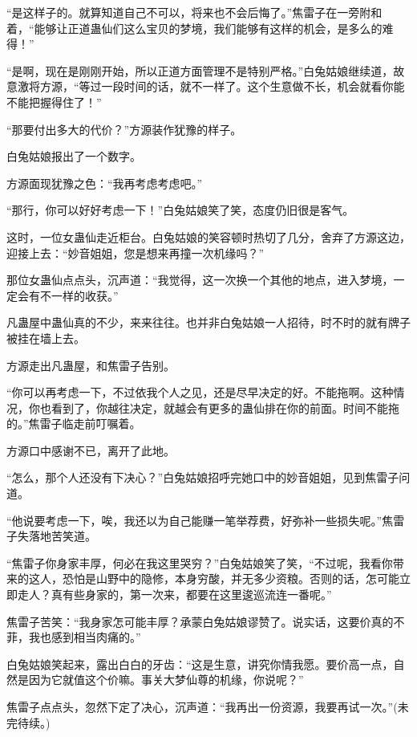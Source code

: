 \begin{this_body}
“是这样子的。就算知道自己不可以，将来也不会后悔了。”焦雷子在一旁附和着，“能够让正道蛊仙们这么宝贝的梦境，我们能够有这样的机会，是多么的难得！”

“是啊，现在是刚刚开始，所以正道方面管理不是特别严格。”白兔姑娘继续道，故意激将方源，“等过一段时间的话，就不一样了。这个生意做不长，机会就看你能不能把握得住了！”

“那要付出多大的代价？”方源装作犹豫的样子。

白兔姑娘报出了一个数字。

方源面现犹豫之色：“我再考虑考虑吧。”

“那行，你可以好好考虑一下！”白兔姑娘笑了笑，态度仍旧很是客气。

这时，一位女蛊仙走近柜台。白兔姑娘的笑容顿时热切了几分，舍弃了方源这边，迎接上去：“妙音姐姐，您是想来再撞一次机缘吗？”

那位女蛊仙点点头，沉声道：“我觉得，这一次换一个其他的地点，进入梦境，一定会有不一样的收获。”

凡蛊屋中蛊仙真的不少，来来往往。也并非白兔姑娘一人招待，时不时的就有牌子被挂在墙上去。

方源走出凡蛊屋，和焦雷子告别。

“你可以再考虑一下，不过依我个人之见，还是尽早决定的好。不能拖啊。这种情况，你也看到了，你越往决定，就越会有更多的蛊仙排在你的前面。时间不能拖的。”焦雷子临走前叮嘱着。

方源口中感谢不已，离开了此地。

“怎么，那个人还没有下决心？”白兔姑娘招呼完她口中的妙音姐姐，见到焦雷子问道。

“他说要考虑一下，唉，我还以为自己能赚一笔举荐费，好弥补一些损失呢。”焦雷子失落地苦笑道。

“焦雷子你身家丰厚，何必在我这里哭穷？”白兔姑娘笑了笑，“不过呢，我看你带来的这人，恐怕是山野中的隐修，本身穷酸，并无多少资粮。否则的话，怎可能立即走人？真有些身家的，第一次来，都要在这里逡巡流连一番呢。”

焦雷子苦笑：“我身家怎可能丰厚？承蒙白兔姑娘谬赞了。说实话，这要价真的不菲，我也感到相当肉痛的。”

白兔姑娘笑起来，露出白白的牙齿：“这是生意，讲究你情我愿。要价高一点，自然是因为它就值这个价嘛。事关大梦仙尊的机缘，你说呢？”

焦雷子点点头，忽然下定了决心，沉声道：“我再出一份资源，我要再试一次。”(未完待续。)

\end{this_body}

